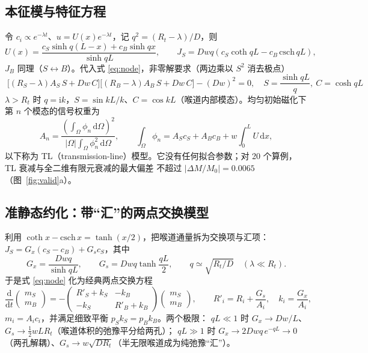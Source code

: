 \documentclass[11pt,a4paper]{article}
\begin{document}
\subsection{本征模与特征方程}
令 $c_i\propto e^{-\lambda t}$、$u=U(x)e^{-\lambda t}$，记 $q^2=(R_t-\lambda)/D$，则
\begin{equation}
U(x)=\frac{c_S\sinh q(L-x)+c_B\sinh qx}{\sinh qL},\qquad
J_S=Dwq\left(c_S\coth qL-c_B\,\mathrm{csch}\,qL\right),
\end{equation}
$J_B$ 同理（$S\leftrightarrow B$）。代入式 \eqref{eq:node}，非零解要求（两边乘以 $S^2$ 消去极点）
\begin{equation}
\boxed{\;\big[(R_S-\lambda)A_S\,S+Dw\,C\big]\big[(R_B-\lambda)A_B\,S+Dw\,C\big]-(Dw)^2=0,\quad S=\frac{\sinh qL}{q},\ C=\cosh qL\;}
\label{eq:char}
\end{equation}
$\lambda>R_t$ 时 $q=\mathrm ik$，$S=\sin kL/k$、$C=\cos kL$（喉道内部模态）。均匀初始磁化下第 $n$ 个模态的信号权重为
\begin{equation}
A_n=\frac{\left(\int_\Omega\phi_n\,\mathrm d\Omega\right)^2}{|\Omega|\int_\Omega\phi_n^2\,\mathrm d\Omega},\qquad
\int_\Omega\phi_n=A_Sc_S+A_Bc_B+w\!\int_0^LU\,\mathrm dx ,
\end{equation}
以下称为 TL（transmission-line）模型。它没有任何拟合参数；对 20 个算例，TL 衰减与全二维有限元衰减的最大偏差
不超过 $|\Delta M/M_0|=0.0065$（图~\ref{fig:valid}a）。

\subsection{准静态约化：带“汇”的两点交换模型}
利用 $\coth x-\mathrm{csch}\,x=\tanh(x/2)$，把喉道通量拆为交换项与汇项：
$J_S=G_x(c_S-c_B)+G_sc_S$，其中
\begin{equation}
G_x=\frac{Dwq}{\sinh qL},\qquad G_s=Dwq\tanh\frac{qL}{2},\qquad q\simeq\sqrt{R_t/D}\quad(\lambda\ll R_t).
\label{eq:gx}
\end{equation}
于是式 \eqref{eq:node} 化为经典两点交换方程\citep{ZimmermanBrittin1957,McDonald2005}
\begin{equation}
\frac{\mathrm d}{\mathrm dt}\begin{pmatrix}m_S\\ m_B\end{pmatrix}=-\begin{pmatrix}R'_S+k_S&-k_B\\-k_S&R'_B+k_B\end{pmatrix}\begin{pmatrix}m_S\\ m_B\end{pmatrix},\qquad
R'_i=R_i+\frac{G_s}{A_i},\quad k_i=\frac{G_x}{A_i},
\end{equation}
$m_i=A_ic_i$，并满足细致平衡 $p_Sk_S=p_Bk_B$。两个极限：
$qL\ll1$ 时 $G_x\to Dw/L$、$G_s\to\tfrac12wLR_t$（喉道体积的弛豫平分给两孔）；
$qL\gg1$ 时 $G_x\to2Dwq\,e^{-qL}\to0$（两孔解耦）、$G_s\to w\sqrt{DR_t}$（半无限喉道成为纯弛豫“汇”）。
\end{document}
